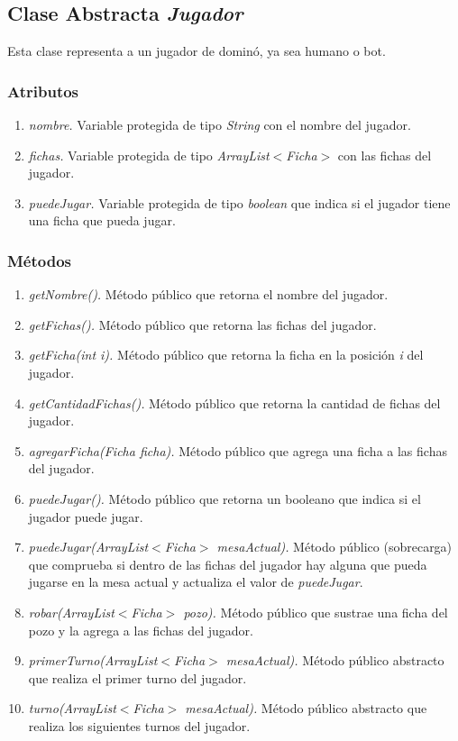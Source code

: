\documentclass[12pt]{article}
\begin{document}
  \subsection{Clase Abstracta \textit{Jugador}}
  Esta clase representa a un jugador de dominó, ya sea humano o bot.

  \subsubsection{Atributos}
  \begin{enumerate}
    \item \textit{nombre.} Variable protegida de tipo \textit{String} con el nombre del jugador.
    \item \textit{fichas.} Variable protegida de tipo \textit{ArrayList$<$Ficha$>$} con las fichas del jugador.
    \item \textit{puedeJugar.} Variable protegida de tipo \textit{boolean} que indica si el jugador tiene una ficha que pueda jugar.
  \end{enumerate}

  \subsubsection{Métodos}
  \begin{enumerate}
    \item \textit{getNombre().} Método público que retorna el nombre del jugador.
    \item \textit{getFichas().} Método público que retorna las fichas del jugador.
    \item \textit{getFicha(int i).} Método público que retorna la ficha en la posición \textit{i} del jugador.
    \item \textit{getCantidadFichas().} Método público que retorna la cantidad de fichas del jugador.
    \item \textit{agregarFicha(Ficha ficha).} Método público que agrega una ficha a las fichas del jugador.
    \item \textit{puedeJugar().} Método público que retorna un booleano que indica si el jugador puede jugar.
    \item \textit{puedeJugar(ArrayList$<$Ficha$>$ mesaActual).} Método público (sobrecarga) que comprueba si dentro de las fichas del jugador hay alguna que pueda jugarse en la mesa actual y actualiza el valor de \textit{puedeJugar}.
    \item \textit{robar(ArrayList$<$Ficha$>$ pozo).} Método público que sustrae una ficha del pozo y la agrega a las fichas del jugador.
    \item \textit{primerTurno(ArrayList$<$Ficha$>$ mesaActual).} Método público abstracto que realiza el primer turno del jugador.
    \item \textit{turno(ArrayList$<$Ficha$>$ mesaActual).} Método público abstracto que realiza los siguientes turnos del jugador. 
  \end{enumerate}
\end{document}
